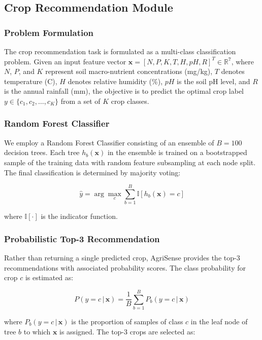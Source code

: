 \subsection{Crop Recommendation Module}

\subsubsection{Problem Formulation}
The crop recommendation task is formulated as a multi-class classification problem. Given an input feature vector $\mathbf{x} = [N, P, K, T, H, pH, R]^T \in \mathbb{R}^7$, where $N$, $P$, and $K$ represent soil macro-nutrient concentrations (mg/kg), $T$ denotes temperature (\textdegree C), $H$ denotes relative humidity (\%), $pH$ is the soil pH level, and $R$ is the annual rainfall (mm), the objective is to predict the optimal crop label $y \in \{c_1, c_2, \ldots, c_K\}$ from a set of $K$ crop classes.

\subsubsection{Random Forest Classifier}
We employ a Random Forest Classifier \cite{breiman2001} consisting of an ensemble of $B = 100$ decision trees. Each tree $h_b(\mathbf{x})$ in the ensemble is trained on a bootstrapped sample of the training data with random feature subsampling at each node split. The final classification is determined by majority voting:

\begin{equation}
\hat{y} = \arg\max_{c} \sum_{b=1}^{B} \mathbb{I}[h_b(\mathbf{x}) = c]
\label{eq:rf_majority}
\end{equation}

where $\mathbb{I}[\cdot]$ is the indicator function.

\subsubsection{Probabilistic Top-3 Recommendation}
Rather than returning a single predicted crop, AgriSense provides the top-3 recommendations with associated probability scores. The class probability for crop $c$ is estimated as:

\begin{equation}
P(y = c \,|\, \mathbf{x}) = \frac{1}{B} \sum_{b=1}^{B} P_b(y = c \,|\, \mathbf{x})
\label{eq:rf_proba}
\end{equation}

where $P_b(y = c \,|\, \mathbf{x})$ is the proportion of samples of class $c$ in the leaf node of tree $b$ to which $\mathbf{x}$ is assigned. The top-3 crops are selected as:

